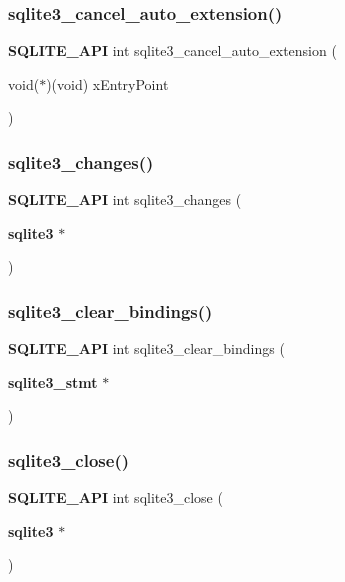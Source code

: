 \mbox{\label{sqlite3_8h_a8f4e0085713ed6c23e1869961970acfa}} 
\subsubsection{sqlite3\_cancel\_auto\_extension()}
{\footnotesize\ttfamily \textbf{ S\+Q\+L\+I\+T\+E\+\_\+\+A\+PI} int sqlite3\+\_\+cancel\+\_\+auto\+\_\+extension (\begin{DoxyParamCaption}\item[{void($\ast$)(void)}]{x\+Entry\+Point }\end{DoxyParamCaption})}

\mbox{\label{sqlite3_8h_a8d082cca92afdcfae0a00ddb7c965205}} 
\subsubsection{sqlite3\_changes()}
{\footnotesize\ttfamily \textbf{ S\+Q\+L\+I\+T\+E\+\_\+\+A\+PI} int sqlite3\+\_\+changes (\begin{DoxyParamCaption}\item[{\textbf{ sqlite3} $\ast$}]{ }\end{DoxyParamCaption})}

\mbox{\label{sqlite3_8h_a7af29912e7d428cc4ee247f15c00a923}} 
\subsubsection{sqlite3\_clear\_bindings()}
{\footnotesize\ttfamily \textbf{ S\+Q\+L\+I\+T\+E\+\_\+\+A\+PI} int sqlite3\+\_\+clear\+\_\+bindings (\begin{DoxyParamCaption}\item[{\textbf{ sqlite3\+\_\+stmt} $\ast$}]{ }\end{DoxyParamCaption})}

\mbox{\label{sqlite3_8h_ac43c9032fc6ef3b2a231dc3a9fa44b2d}} 
\subsubsection{sqlite3\_close()}
{\footnotesize\ttfamily \textbf{ S\+Q\+L\+I\+T\+E\+\_\+\+A\+PI} int sqlite3\+\_\+close (\begin{DoxyParamCaption}\item[{\textbf{ sqlite3} $\ast$}]{ }\end{DoxyParamCaption})}

